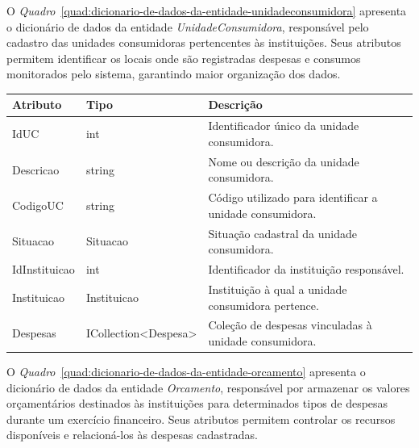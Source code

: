 O \textit{Quadro}~\ref{quad:dicionario-de-dados-da-entidade-unidadeconsumidora} apresenta o dicionário de dados da entidade \textit{UnidadeConsumidora}, responsável pelo cadastro das unidades consumidoras pertencentes às instituições. Seus atributos permitem identificar os locais onde são registradas despesas e consumos monitorados pelo sistema, garantindo maior organização dos dados.

\begin{quadro}[H]
\caption[Dicionário de dados da entidade UnidadeConsumidora]{Dicionário de dados da entidade UnidadeConsumidora}
\label{quad:dicionario-de-dados-da-entidade-unidadeconsumidora}

\begin{tabular}{|p{}|p{}|p{}|}
\hline
\textbf{Atributo} & \textbf{Tipo} & \textbf{Descrição} \\ 
\hline
IdUC & int & Identificador único da unidade consumidora. \\ 
\hline
Descricao & string & Nome ou descrição da unidade consumidora. \\ 
\hline
CodigoUC & string & Código utilizado para identificar a unidade consumidora. \\ 
\hline
Situacao & Situacao & Situação cadastral da unidade consumidora. \\ 
\hline
IdInstituicao & int & Identificador da instituição responsável. \\ 
\hline
Instituicao & Instituicao & Instituição à qual a unidade consumidora pertence. \\ 
\hline
Despesas & ICollection<Despesa> & Coleção de despesas vinculadas à unidade consumidora. \\ 
\hline
\end{tabular}


\end{quadro}


O \textit{Quadro}~\ref{quad:dicionario-de-dados-da-entidade-orcamento} apresenta o dicionário de dados da entidade \textit{Orcamento}, responsável por armazenar os valores orçamentários destinados às instituições para determinados tipos de despesas durante um exercício financeiro. Seus atributos permitem controlar os recursos disponíveis e relacioná-los às despesas cadastradas.

